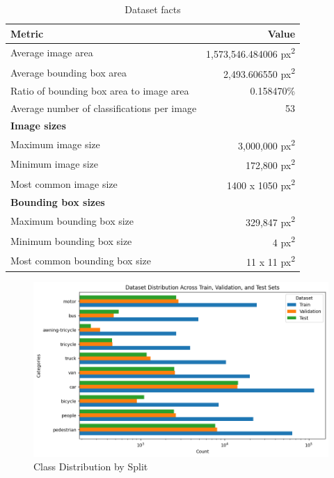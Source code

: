 \documentclass[stu,12pt,floatsintext]{apa7}
\begin{document}
\begin{table}[!htb]
	\centering
	\begin{tabular}{lr}
		\hline
		\textbf{Metric}                             & \textbf{Value}                         \\
		\hline
		Average image area                          & 1,573,546.484006 px\textsuperscript{2} \\
		Average bounding box area                   & 2,493.606550 px\textsuperscript{2}     \\
		Ratio of bounding box area to image area    & 0.158470\%                             \\
		Average number of classifications per image & 53                                     \\
		\hline
		\textbf{Image sizes}                        &                                        \\
		\hline
		Maximum image size                          & 3,000,000 px\textsuperscript{2}        \\
		Minimum image size                          & 172,800 px\textsuperscript{2}          \\
		Most common image size                      & 1400 x 1050 px\textsuperscript{2}      \\
		\hline
		\textbf{Bounding box sizes}                 &                                        \\
		\hline
		Maximum bounding box size                   & 329,847 px\textsuperscript{2}          \\
		Minimum bounding box size                   & 4 px\textsuperscript{2}                \\
		Most common bounding box size               & 11 x 11 px\textsuperscript{2}          \\
		\hline
	\end{tabular}
	\caption{Dataset facts}
	\label{tab:facts}
\end{table}



\begin{figure}[!htb]
	\centering
	\includegraphics[width=0.75\linewidth]{class_distribution.png}
	\caption{Class Distribution by Split}
	\label{fig:cls_distrib}
\end{figure}
\end{document}
